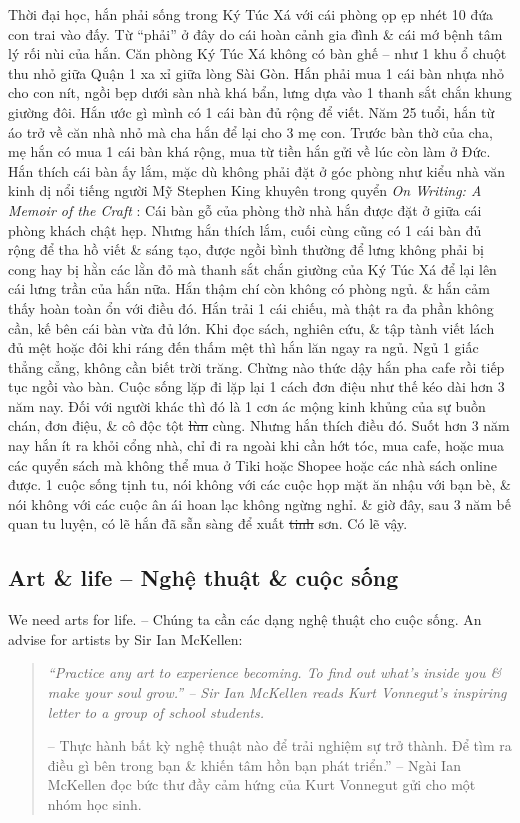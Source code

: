 \documentclass[12pt]{article}
\begin{document}
Thời đại học, hắn phải sống trong Ký Túc Xá với cái phòng ọp ẹp nhét 10 đứa con trai vào đấy. Từ ``phải'' ở đây do cái hoàn cảnh gia đình \& cái mớ bệnh tâm lý rối nùi của hắn. Căn phòng Ký Túc Xá không có bàn ghế -- như 1 khu ổ chuột thu nhỏ giữa Quận 1 xa xỉ giữa lòng Sài Gòn. Hắn phải mua 1 cái bàn nhựa nhỏ cho con nít, ngồi bẹp dưới sàn nhà khá bẩn, lưng dựa vào 1 thanh sắt chắn khung giường đôi. Hắn ước gì mình có 1 cái bàn đủ rộng để viết. Năm 25 tuổi, hắn từ {\sc á}o trở về căn nhà nhỏ mà cha hắn để lại cho 3 mẹ con. Trước bàn thờ của cha, mẹ hắn có mua 1 cái bàn khá rộng, mua từ tiền hắn gửi về lúc còn làm ở Đức. Hắn thích cái bàn ấy lắm, mặc dù không phải đặt ở góc phòng như kiểu nhà văn kinh dị nổi tiếng người Mỹ {\sc Stephen King} khuyên trong quyển {\it On Writing: A Memoir of the Craft} \cite{King2000,King2010}: Cái bàn gỗ của phòng thờ nhà hắn được đặt ở giữa cái phòng khách chật hẹp. Nhưng hắn thích lắm, cuối cùng cũng có 1 cái bàn đủ rộng để tha hồ viết \& sáng tạo, được ngồi bình thường để lưng không phải bị cong hay bị hằn các lằn đỏ mà thanh sắt chắn giường của Ký Túc Xá để lại lên cái lưng trần của hắn nữa. Hắn thậm chí còn không có phòng ngủ. \& hắn cảm thấy hoàn toàn ổn với điều đó. Hắn trải 1 cái chiếu, mà thật ra đa phần không cần, kế bên cái bàn vừa đủ lớn. Khi đọc sách, nghiên cứu, \& tập tành viết lách đủ mệt hoặc đôi khi ráng đến thấm mệt thì hắn lăn ngay ra ngủ. Ngủ 1 giấc thẳng cẳng, không cần biết trời trăng. Chừng nào thức dậy hắn pha cafe rồi tiếp tục ngồi vào bàn. Cuộc sống lặp đi lặp lại 1 cách đơn điệu như thế kéo dài hơn 3 năm nay. Đối với người khác thì đó là 1 cơn ác mộng kinh khủng của sự  buồn chán, đơn điệu, \& cô độc tột \st{lùn} cùng. Nhưng hắn thích điều đó. Suốt hơn 3 năm nay hắn ít ra khỏi cổng nhà, chỉ đi ra ngoài khi cần hớt tóc, mua cafe, hoặc mua các quyển sách mà không thể mua ở Tiki hoặc Shopee hoặc các nhà sách online được. 1 cuộc sống tịnh tu, nói không với các cuộc họp mặt ăn nhậu với bạn bè, \& nói không với các cuộc ân ái hoan lạc không ngừng nghỉ. \& giờ đây, sau 3 năm bế quan tu luyện, có lẽ hắn đã sẵn sàng để xuất \st{tinh} sơn. Có lẽ vậy.

\subsection{Art \& life -- Nghệ thuật \& cuộc sống}
We need arts for life. -- Chúng ta cần các dạng nghệ thuật cho cuộc sống. An advise for artists by Sir {\sc Ian McKellen}:
\begin{quotation}
	{\it``Practice any art to experience becoming. To find out what's inside you \& make your soul grow.'' -- Sir {\sc Ian McKellen} reads {\sc Kurt Vonnegut}'s inspiring letter to a group of school students.}
	
	-- Thực hành bất kỳ nghệ thuật nào để trải nghiệm sự trở thành. Để tìm ra điều gì bên trong bạn \& khiến tâm hồn bạn phát triển.'' -- Ngài {\sc Ian McKellen} đọc bức thư đầy cảm hứng của {\sc Kurt Vonnegut} gửi cho một nhóm học sinh.
\end{quotation}
\end{document}
